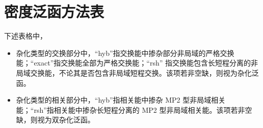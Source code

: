 
\chapter{密度泛函方法表}

\begingroup
\setlength{\LTleft}{-20cm plus -1fill}
\setlength{\LTright}{\LTleft}

下述表格中，
\begin{itemize}[nosep]
    \item 杂化类型的交换部分中，“hyb”指交换能中掺杂部分非局域的严格交换能；“exact”指交换能全部为严格交换能；“rsh” 指交换能包含长短程分离的非局域交换能，不论其是否包含非局域短程交换。该项若非空缺，则视为杂化泛函。
    \item 杂化类型的相关部分中，“hyb”指相关能中掺杂 MP2 型非局域相关能；“rsh”指相关能中掺杂长短程分离的 MP2 型非局域相关能。该项若非空缺，则视为双杂化泛函。
\end{itemize}

